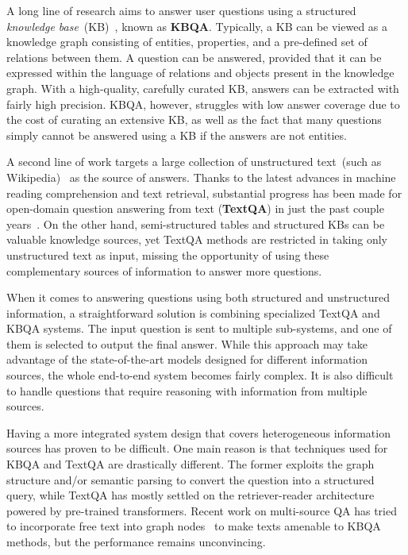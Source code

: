 \documentclass[11pt]{article}
\begin{document}
A long line of research aims to answer user questions using a structured \emph{knowledge base}~(KB)~\citep{WebQ, yih2015semantic}, known as \textbf{KBQA}.
Typically, a KB can be viewed as a knowledge graph consisting of entities, properties, and a pre-defined set of relations between them. 
A question can be answered, provided that it can be expressed within the language of relations and objects present in the knowledge graph.
With a high-quality, carefully curated KB, answers can be extracted with fairly high precision.
KBQA, however, struggles with low answer coverage due to the cost of curating an extensive KB, as well as the fact that many questions simply cannot be answered using a KB if the answers are not entities.

A second line of work targets a large collection of unstructured text~(such as Wikipedia)~\citep{drqa} as the source of answers.
Thanks to the latest advances in machine reading comprehension and text retrieval, substantial progress has been made for open-domain question answering from text (\textbf{TextQA}) in just the past couple years~\citep{yang2019end, ORQA, DPR, REALM, izacard-grave-2021-leveraging}.
On the other hand, semi-structured tables and structured KBs can be valuable knowledge sources, yet TextQA methods are restricted in taking only unstructured text as input, missing the opportunity of using these complementary sources of information to answer more questions.


When it comes to answering questions using both structured and unstructured information, a straightforward solution is combining specialized TextQA and KBQA systems.
The input question is sent to multiple sub-systems, and one of them is selected to output the final answer.
While this approach may take advantage of the state-of-the-art models designed for different information sources, the whole end-to-end system becomes fairly complex. It is also difficult to handle questions that require reasoning with information from multiple sources.

Having a more integrated system design that covers heterogeneous information sources has proven to be difficult. 
One main reason is that techniques used for KBQA and TextQA are drastically different.
The former exploits the graph structure and/or semantic parsing to convert the question into a structured query, while TextQA has mostly settled on the retriever-reader architecture powered by pre-trained transformers.
Recent work on multi-source QA has tried to incorporate free text into graph nodes~\citep{sun2018open, lu2019answering} to make texts amenable to KBQA methods, but the performance remains unconvincing. 
\end{document}
